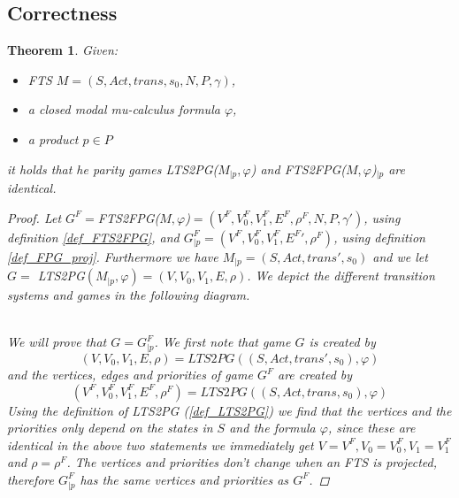 \documentclass[]{article}
\newtheorem{theorem}{Theorem}[section]
\begin{document}
\subsection{Correctness}
\begin{theorem}
	\label{the_PGsubPGA} Given:
	\begin{itemize}
		\item FTS $M = (S,Act, trans, s_0, N, P, \gamma)$,
		\item a closed modal mu-calculus formula $\varphi$,
		\item a product $p \in P$
	\end{itemize}
	it holds that he parity games LTS2PG($M_{|p}, \varphi$) and FTS2FPG($M, \varphi$)$_{|p}$  are identical.
\begin{proof}
	Let $G^F = $FTS2FPG($M, \varphi$)$ = (V^F, V_0^F, V_1^F, E^F, \rho^F, N, P, \gamma')$, using definition \ref{def_FTS2FPG}, and $G^F_{|p} = (V^F, V_0^F, V_1^F, {E^F}', \rho^F)$, using definition \ref{def_FPG_proj}. Furthermore we have $M_{|p} = (S, Act, trans', s_0)$ and we let $G = $ LTS2PG$(M_{|p}, \varphi) = (V, V_0, V_1, E, \rho)$. We depict the different transition systems and games in the following diagram.
	
	\\
	We will prove that $G = G_{|p}^F$. We first note that game $G$ is created by 
	\[  (V, V_0, V_1, E, \rho) = LTS2PG((S, Act, trans', s_0),\varphi) \]
	and the vertices, edges and priorities of game $G^F$ are created by 
	\[ (V^F, V_0^F, V_1^F, E^F, \rho^F) = LTS2PG((S,Act, trans, s_0), \varphi)\]
	Using the definition of LTS2PG (\ref{def_LTS2PG}) we find that the vertices and the priorities only depend on the states in $S$ and the formula $\varphi$, since these are identical in the above two statements we immediately get $V = V^F, V_0 = V_0^F, V_1 = V_1^F$ and $\rho = \rho^F$. The vertices and priorities don't change when an FTS is projected, therefore $G_{|p}^F$ has the same vertices and priorities as $G^F$.
	

\end{proof}
\end{theorem}
\end{document}
